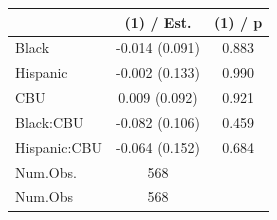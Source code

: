 
\begin{tabular}[t]{lcc}
\toprule
  & (1) / Est. & (1) / p\\
\midrule
Black & -0.014 
(0.091) & 0.883\\
Hispanic & -0.002 
(0.133) & 0.990\\
CBU & 0.009 
(0.092) & 0.921\\
Black:CBU & -0.082 
(0.106) & 0.459\\
Hispanic:CBU & -0.064 
(0.152) & 0.684\\
\midrule
Num.Obs. & 568 & \\
Num.Obs & 568 & \\
\bottomrule
\end{tabular}
